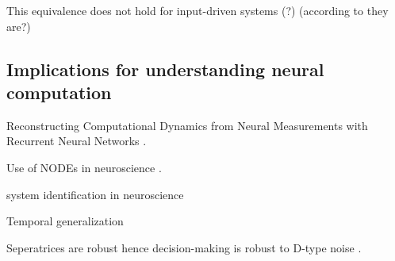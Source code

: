 \documentclass{article}
\theoremstyle{definition} \newtheorem{definition}{Definition}
\theoremstyle{remark} \newtheorem{remark}{Remark}
\newcounter{ct}
\begin{document}
This equivalence does not hold for input-driven systems (?)  (according to \citep{dinc2025latentcomputing} they are?)



\subsection{Implications for understanding neural computation} 
Reconstructing Computational Dynamics from Neural Measurements with Recurrent Neural Networks \citep{durstewitz2023reconstructing}.

Use of NODEs in neuroscience \citep{kim2021inferring}.

system identification in neuroscience \citep{han2023si} 

Temporal generalization

Seperatrices are robust hence decision-making is robust to D-type noise \citep{Park2023a}.





\end{document}

